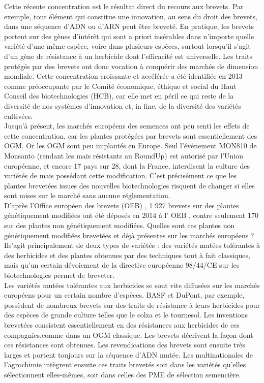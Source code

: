 \documentclass[8pt]{article}
\begin{document}
Cette récente concentration est le résultat direct du recours aux brevets. Par exemple, tout élément qui constitue une innovation, au sens du droit des brevets, dans une séquence d’ADN ou d’ARN peut être breveté. En pratique, les brevets portent sur des gènes d’intérêt qui sont a priori insérables dans n’importe quelle variété d’une même espèce, voire dans plusieurs espèces, surtout lorsqu’il s’agit d’un gène de résistance à un herbicide dont l’efficacité est universelle. Les traits protégés par des brevets ont donc vocation à conquérir des marchés de dimension mondiale. 
Cette concentration croissante et accélérée a été
identifiée en 2013 comme préoccupante par
le Comité économique, éthique et social du
Haut Conseil des biotechnologies (HCB), car
elle met en péril ce qui reste de la diversité
de nos systèmes d’innovation et, in fine, de
la diversité des variétés cultivées.\\

Jusqu’à présent, les marchés européens
des semences ont peu senti les effets de
cette concentration, car les plantes protégées
par brevets sont essentiellement des OGM. Or
les OGM sont peu implantés en Europe. Seul
l’événement MON810 de Monsanto (rendant
les maïs résistants au RoundUp) est autorisé
par l’Union européenne, et encore 17 pays
sur 28, dont la France, interdisent la culture
des variétés de maïs possédant cette modification. C’est précisément ce que les plantes
brevetées issues des nouvelles biotechnologies risquent de changer si elles sont mises
sur le marché sans aucune réglementation.\\

D’après l’Office européen des brevets (OEB) ,
1 927 brevets sur des plantes génétiquement
modifiées ont été déposés en 2014 à l’ OEB ,
contre seulement 170 sur des plantes non
génétiquement modifiées. Quelles sont ces
plantes non génétiquement modifiées brevetées et déjà présentes sur les marchés européens ? Ils’agit principalement de deux types de
variétés : des variétés mutées tolérantes à
des herbicides et des plantes obtenues par
des techniques tout à fait classiques, mais
qu’un certain dévoiement de la directive
européenne 98/44/CE sur les biotechnologies
permet de breveter.\\

Les variétés mutées tolérantes aux herbicides se sont vite diffusées sur les marchés
européens pour un certain nombre d’espèces.
BASF et DuPont, par exemple, possèdent de
nombreux brevets sur des traits de résistance
à leurs herbicides pour des espèces de grande
culture telles que le colza et le tournesol. Les
inventions brevetées consistent essentiellement en des résistances aux herbicides de ces
compagnies,comme dans un OGM classique. Les
brevets décrivent la façon dont ces résistances
sont obtenues. Les revendications des brevets
sont ensuite très larges et portent toujours
sur la séquence d’ADN mutée. Les multinationales de l’agrochimie intègrent ensuite ces
traits brevetés soit dans les variétés qu’elles
sélectionnent elles-mêmes, soit dans celles
des PME de sélection semencière.\\
\end{document}

